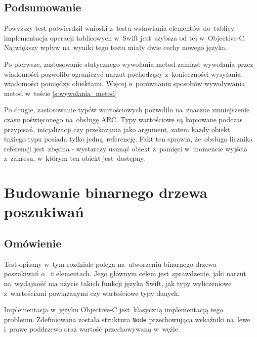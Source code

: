 \documentclass[mgr, shortabstract]{iithesis}
\newcommand{\swiftinline}[1]{
    \texttt{#1}
}
\newcommand{\objcinline}[1]{
    \texttt{#1}
}
\begin{document}
\subsection{Podsumowanie}

Powyższy test potwierdził wnioski z~testu wstawiania elementów do~tablicy - implementacja operacji tablicowych w~Swift jest~szybsza od tej w~Objective-C. Największy wpływ na~wyniki tego testu miały dwie cechy nowego języka.

Po pierwsze, zastosowanie statycznego wywołania metod zamiast wywołania przez wiadomości pozwoliło ograniczyć narzut pochodzący z~konieczności wysyłania wiadomości pomiędzy obiektami. Więcej o~porównaniu sposobów wywoływania metod w~teście \ref{s:wywolania_metod}

Po drugie, zastosowanie typów wartościowych pozwoliło na~znaczne zmniejszenie czasu poświęconego na~obsługę ARC. Typy wartościowe są kopiowane podczas przypisań, inicjalizacji czy przekazania jako argument, zatem każdy obiekt takiego typu posiada tylko jedną referencję. Fakt ten sprawia, że~obsługa licznika referencji jest~zbędna - wystarczy usunąć obiekt z~pamięci w~momencie wyjścia z~zakresu, w~którym ten obiekt jest~dostępny.

\section{Budowanie binarnego drzewa poszukiwań}

\subsection{Omówienie}

Test opisany w~tym rozdziale polega na~utworzeniu binarnego drzewa poszukiwań o~\swiftinline{n} elementach. Jego głównym celem jest~sprawdzenie, jaki narzut na~wydajność ma użycie takich funkcji języka Swift, jak typy wyliczeniowe z~wartościami powiązanymi czy wartościowe typy danych.

Implementacja w~języku Objective-C jest~klasyczną implementacją tego problemu. Zdefiniowana została struktura \objcinline{Node} przechowująca wskaźniki na~lewe i~prawe poddrzewo oraz wartość przechowywaną w~węźle.
\end{document}

